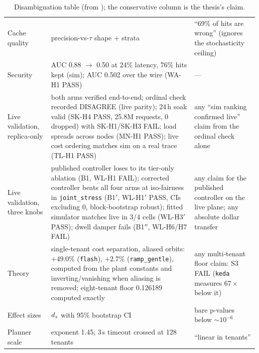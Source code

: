 \begin{table}[htbp]
\begin{tabularx}{\textwidth}{@{}lXX@{}}
Cache quality & precision-vs-$\tau$ shape $+$ strata & ``69\% of hits are
wrong'' (ignores the stochasticity ceiling) \\
Security & AUC 0.88 $\to$ 0.50 at 24\% latency, 76\% hits kept (sim);
AUC 0.502 over the wire (WA-H1 PASS) & --- \\
Live validation, replica-only & both arms verified end-to-end; ordinal
check recorded DISAGREE (live parity); 24\,h soak valid (SK-H4 PASS, 25.8M
requests, 0 dropped) with SK-H1/SK-H3 FAIL; load spreads across nodes
(MN-H1 PASS); live cost ordering matches sim on a real trace (TL-H1 PASS)
& any ``sim ranking confirmed live'' claim from the ordinal check alone \\
Live validation, three knobs & published controller loses to its tier-only
ablation (B1, WL-H1 FAIL); corrected controller beats all four arms at
iso-fairness in \texttt{joint\_stress} (B1$'$, WL-H1$'$ PASS, CIs
excluding 0, block-bootstrap robust); fitted simulator matches live in 3/4
cells (WL-H3$'$ PASS); dwell damper fails (B1$''$, WL-H6/H7 FAIL) & any
claim for the published controller on the live plane; any absolute dollar
transfer \\
Theory & single-tenant cost separation, aliased orbits: $+49.0\%$
(\texttt{flash}), $+2.7\%$ (\texttt{ramp\_gentle}), computed from the plant
constants and inverting/vanishing when aliasing is removed; eight-tenant
floor 0.126189 computed exactly & any multi-tenant floor claim: S3 FAIL
(\texttt{keda} measures $67\times$ below it) \\
Effect sizes & $d_z$ with 95\% bootstrap CI & bare p-values below
${\sim}10^{-6}$ \\
Planner scale & exponent 1.45; 3\,s timeout crossed at 128 tenants &
``linear in tenants'' \\
\bottomrule
\end{tabularx}
\caption{Disambiguation table (from ); the
conservative column is the thesis's claim.}
\label{tab:which-number}
\end{table}
